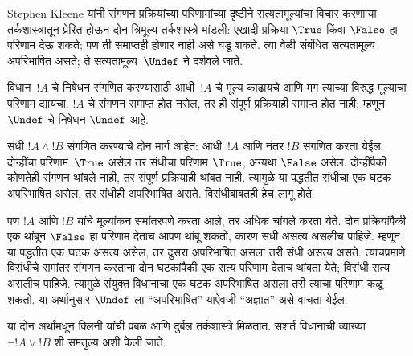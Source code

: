 \documentclass[../../../include/open-logic-section]{subfiles}
\begin{document}


Stephen Kleene यांनी संगणन प्रक्रियांच्या परिणामांच्या दृष्टीने
सत्यतामूल्यांचा विचार करणाऱ्या तर्कशास्त्रातून प्रेरित होऊन दोन
त्रिमूल्य तर्कशास्त्रे मांडली: एखादी प्रक्रिया $\True$ किंवा
$\False$ हा परिणाम देऊ शकते; पण ती समाप्तही होणार नाही असे
घडू शकते. त्या वेळी संबंधित सत्यतामूल्य अपरिभाषित असते;
ते सत्यतामूल्य~$\Undef$ ने दर्शवले जाते.

विधान~$!A$ चे निषेधन संगणित करण्यासाठी आधी~$!A$ चे मूल्य
काढायचे आणि मग त्याच्या विरुद्ध मूल्याचा परिणाम द्यायचा.
$!A$ चे संगणन समाप्त होत नसेल, तर ही संपूर्ण प्रक्रियाही
समाप्त होत नाही; म्हणून $\Undef$ चे निषेधन $\Undef$ आहे.

संधी $!A \land !B$ संगणित करण्याचे दोन मार्ग आहेत: आधी~$!A$
आणि नंतर $!B$ संगणित करता येईल. दोन्हींचा परिणाम~$\True$
असेल तर संधीचा परिणाम $\True$, अन्यथा $\False$ असेल.
दोन्हींपैकी कोणतेही संगणन थांबले नाही, तर संपूर्ण प्रक्रियाही
थांबत नाही. त्यामुळे या पद्धतीत संधीचा एक घटक अपरिभाषित
असेल, तर संधीही अपरिभाषित असते. विसंधीबाबतही हेच लागू होते.

पण $!A$ आणि $!B$ यांचे मूल्यांकन समांतरपणे करता आले, तर
अधिक चांगले करता येते. दोन प्रक्रियांपैकी एक थांबून $\False$
हा परिणाम देताच आपण थांबू शकतो, कारण संधी असत्य असलीच
पाहिजे. म्हणून या पद्धतीत एक घटक असत्य असेल, तर दुसरा
अपरिभाषित असला तरी संधी असत्य असते. त्याचप्रमाणे विसंधीचे
समांतर संगणन करताना दोन घटकांपैकी एक सत्य परिणाम देताच
थांबता येते; विसंधी सत्य असलीच पाहिजे. त्यामुळे संयुक्त
विधानाचा एक घटक अपरिभाषित असला तरी त्याचा परिणाम कळू
शकतो. या अर्थानुसार $\Undef$ ला ``अपरिभाषित'' याऐवजी
``अज्ञात'' असे वाचता येईल.

या दोन अर्थांमधून क्लिनी यांची प्रबळ आणि दुर्बल तर्कशास्त्रे
मिळतात. सशर्त विधानाची व्याख्या $\lnot !A \lor !B$ शी
समतुल्य अशी केली जाते.
\end{document}
